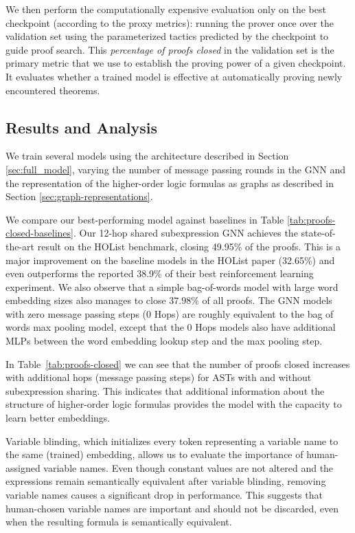 \documentclass[letterpaper]{article} \usepackage{aaai20}  \usepackage{times}  \usepackage{helvet} \usepackage{courier}  \usepackage[hyphens]{url}  \usepackage{graphicx} \urlstyle{rm} \def\UrlFont{\rm}  \usepackage{graphicx}  \frenchspacing  \setlength{\pdfpagewidth}{8.5in}  \setlength{\pdfpageheight}{11in}
\begin{document}
We then perform the computationally expensive evaluation only on the best checkpoint (according to the proxy metrics): running the prover once over the validation set using the parameterized tactics predicted by the checkpoint to guide proof search. 
This {\it percentage of proofs closed} in the validation set is the primary metric that we use to establish the proving power of a given checkpoint.
It evaluates whether a trained model is effective at automatically proving newly encountered theorems.


\subsection{Results and Analysis}

We train several models using the architecture described in Section \ref{sec:full_model}, varying the number of message passing rounds in the GNN and the representation of the higher-order logic formulas as graphs as described in Section \ref{sec:graph-representations}.


We compare our best-performing model against baselines in Table \ref{tab:proofs-closed-baselines}. Our 12-hop shared subexpression GNN achieves the state-of-the-art result on the HOList benchmark, closing 49.95\% of the proofs. This is a major improvement on the baseline models in the HOList paper (32.65\%) and even outperforms the reported 38.9\% of their best reinforcement learning experiment.
We also observe that a simple bag-of-words model with large word embedding sizes also manages to close $37.98\%$ of all proofs. The GNN models with zero message passing steps (0 Hops) are roughly equivalent to the bag of words max pooling model, except that the 0 Hops models also have additional MLPs between the word embedding lookup step and the max pooling step.

In Table~\ref{tab:proofs-closed} we can see that the number of proofs closed increases with additional hops (message passing steps) for ASTs with and without subexpression sharing. This indicates that additional information about the structure of higher-order logic formulas provides the model with the capacity to learn better embeddings.

Variable blinding, which initializes every token representing a variable name to the same (trained) embedding, allows us to evaluate the importance of human-assigned variable names.
Even though constant values are not altered and the expressions remain semantically equivalent after variable blinding, removing variable names causes a significant drop in performance.
This suggests that human-chosen variable names are important and should not be discarded, even when the resulting formula is semantically equivalent.
\end{document}
